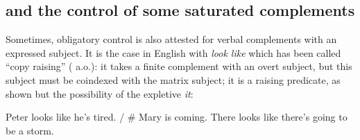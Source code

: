\documentclass[output=paper
	        ,collection
	        ,collectionchapter
 	        ,biblatex
                ,babelshorthands
                ,newtxmath
                ,draftmode
                ,colorlinks, citecolor=brown
]{./langsci/langscibook}
\begin{document}


\subsection{\xarg and the control of some saturated complements}

Sometimes, obligatory control is also attested for verbal complements with an expressed subject. It is the case in English with \emph{look like} which has been called ``copy raising'' (\citealp{Rogers74a-u,Hornstein99a-u} a.o.): it takes a finite complement with an overt subject, but this subject must be coindexed with the matrix subject; it is a raising predicate, as shown but the possibility of the expletive \emph{it}:

\eal
\ex Peter looks like he's tired. / \# Mary is coming.
\ex There looks like there's going to be a storm. \citep[ex 17]{Sag2007a}\\
\zl
\end{document}
